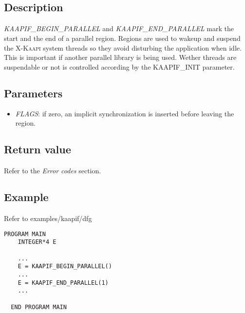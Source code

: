 \documentclass[a4paper, 11pt]{article}
\newcommand{\kaapi}{\textsc{X-Kaapi}\xspace}
\begin{document}
\subsection{Description}
\paragraph{}
\textit{KAAPIF\_BEGIN\_PARALLEL} and \textit{KAAPIF\_END\_PARALLEL} mark the
start and the end of a parallel region. Regions are used to wakeup and suspend
the \kaapi system threads so they avoid disturbing the application when idle.
This is important if another parallel library is being used. Wether threads
are suspendable or not is controlled according by the KAAPIF\_INIT parameter.

\subsection{Parameters}
\begin{itemize}
\item \textit{FLAGS}: if zero, an implicit synchronization is inserted before
leaving the region.
\end{itemize}

\subsection{Return value}
\paragraph{}
Refer to the \textit{Error codes} section.

\subsection{Example}
\paragraph{}
Refer to examples/kaapif/dfg\\
\begin{small}
\begin{lstlisting}[frame=tb]
  PROGRAM MAIN
    INTEGER*4 E

    ...
    E = KAAPIF_BEGIN_PARALLEL()
    ...
    E = KAAPIF_END_PARALLEL(1)
    ...

  END PROGRAM MAIN
\end{lstlisting}
\end{small}
\end{document}
